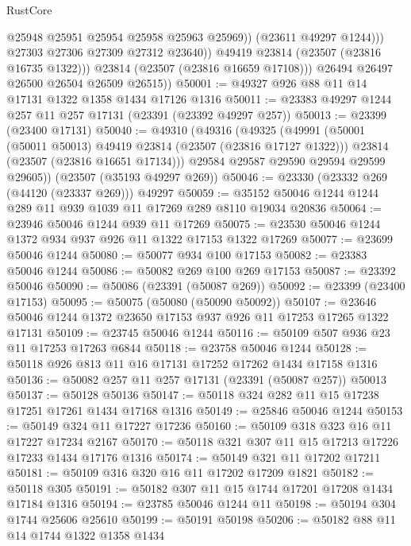 \begin{lexlean}{RustCore}
\begin{coremodule}
                        @25948
                        @25951
                        @25954
                        @25958
                        @25963
                        @25969))
                    (@23611 @49297 @1244)))
                @27303
                @27306
                @27309
                @27312
                @23640))
            @49419
            @23814
            (@23507 (@23816 @16735 @1322)))
          @23814
          (@23507 (@23816 @16659 @17108)))
        @26494
        @26497
        @26500
        @26504
        @26509
        @26515))
@50001 := @49327 @926 @88 @11 @14 @17131 @1322 @1358 @1434 @17126 @1316
@50011 := @23383 @49297 @1244 @257 @11 @257 @17131 (@23391 (@23392 @49297 @257))
@50013 := @23399 (@23400 @17131)
@50040 := @49310
    (@49316
      (@49325
        (@49991
          (@50001 (@50011 @50013) @49419 @23814 (@23507 (@23816 @17127 @1322)))
          @23814
          (@23507 (@23816 @16651 @17134)))
        @29584
        @29587
        @29590
        @29594
        @29599
        @29605))
    (@23507 (@35193 @49297 @269))
@50046 := @23330 (@23332 @269 (@44120 (@23337 @269))) @49297
@50059 := @35152 @50046 @1244 @1244 @289 @11 @939 @1039 @11 @17269 @289 @8110 @19034 @20836
@50064 := @23946 @50046 @1244 @939 @11 @17269
@50075 := @23530 @50046 @1244 @1372 @934 @937 @926 @11 @1322 @17153 @1322 @17269
@50077 := @23699 @50046 @1244
@50080 := @50077 @934 @100 @17153
@50082 := @23383 @50046 @1244
@50086 := @50082 @269 @100 @269 @17153
@50087 := @23392 @50046
@50090 := @50086 (@23391 (@50087 @269))
@50092 := @23399 (@23400 @17153)
@50095 := @50075 (@50080 (@50090 @50092))
@50107 := @23646 @50046 @1244 @1372 @23650 @17153 @937 @926 @11 @17253 @17265 @1322 @17131
@50109 := @23745 @50046 @1244
@50116 := @50109 @507 @936 @23 @11 @17253 @17263 @6844
@50118 := @23758 @50046 @1244
@50128 := @50118 @926 @813 @11 @16 @17131 @17252 @17262 @1434 @17158 @1316
@50136 := @50082 @257 @11 @257 @17131 (@23391 (@50087 @257)) @50013
@50137 := @50128 @50136
@50147 := @50118 @324 @282 @11 @15 @17238 @17251 @17261 @1434 @17168 @1316
@50149 := @25846 @50046 @1244
@50153 := @50149 @324 @11 @17227 @17236
@50160 := @50109 @318 @323 @16 @11 @17227 @17234 @2167
@50170 := @50118 @321 @307 @11 @15 @17213 @17226 @17233 @1434 @17176 @1316
@50174 := @50149 @321 @11 @17202 @17211
@50181 := @50109 @316 @320 @16 @11 @17202 @17209 @1821
@50182 := @50118 @305
@50191 := @50182 @307 @11 @15 @1744 @17201 @17208 @1434 @17184 @1316
@50194 := @23785 @50046 @1244 @11
@50198 := @50194 @304 @1744 @25606 @25610
@50199 := @50191 @50198
@50206 := @50182 @88 @11 @14 @1744 @1322 @1358 @1434

\end{coremodule}
\end{lexlean}
